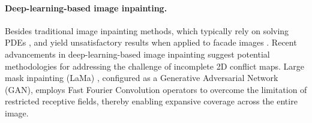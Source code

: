 \paragraph{Deep-learning-based image inpainting.}
Besides traditional image inpainting methods, which typically rely on solving \gls{PDE}s \cite{Telea2004,Bertalmio2001}, and yield unsatisfactory results when applied to facade images \cite{fritzsche2022inpainting}. 
Recent advancements in deep-learning-based image inpainting suggest potential methodologies for addressing the challenge of incomplete 2D conflict maps. 
Large mask inpainting (LaMa) \cite{Suvorov2021}, configured as a Generative Adversarial Network (GAN), employs Fast Fourier Convolution operators \cite{Chi2020FFC} to overcome the limitation of restricted receptive fields, thereby enabling expansive coverage across the entire image.



